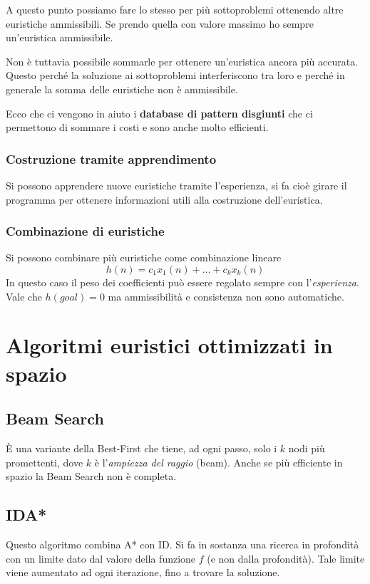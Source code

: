 A questo punto possiamo fare lo stesso per pi\`u sottoproblemi ottenendo altre euristiche
ammissibili. Se prendo quella con valore massimo ho sempre un'euristica ammissibile.

Non \`e tuttavia possibile sommarle per ottenere un'euristica ancora pi\`u accurata. Questo
perch\'e la soluzione ai sottoproblemi interferiscono tra loro e perch\'e in generale la somma
delle euristiche non \`e ammissibile.

Ecco che ci vengono in aiuto i \textbf{database di pattern disgiunti} che ci permettono di
sommare i costi e sono anche molto efficienti.

\subsubsection{Costruzione tramite apprendimento}
Si possono apprendere nuove euristiche tramite l'esperienza, si fa cio\`e girare il programma
per ottenere informazioni utili alla costruzione dell'euristica.

\subsubsection{Combinazione di euristiche}
Si possono combinare pi\`u euristiche come combinazione lineare
\[ h(n) = c_1 x_1(n) + \dots + c_k x_k(n) \]
In questo caso il peso dei coefficienti pu\`o essere regolato sempre con l'\emph{esperienza}.
Vale che $h(goal) = 0$ ma ammissibilit\`a e consistenza non sono automatiche.

\section{Algoritmi euristici ottimizzati in spazio}
\subsection{Beam Search}
\`E una variante della Best-First che tiene, ad ogni passo, solo i $k$ nodi pi\`u
promettenti, dove $k$ \`e l'\emph{ampiezza del raggio} (beam). Anche se pi\`u efficiente
in spazio la Beam Search non \`e completa.

\subsection{IDA*}
Questo algoritmo combina A* con ID. Si fa in sostanza una ricerca in profondit\`a con
un limite dato dal valore della funzione $f$ (e non dalla profondit\`a). Tale limite viene
aumentato ad ogni iterazione, fino a trovare la soluzione.

